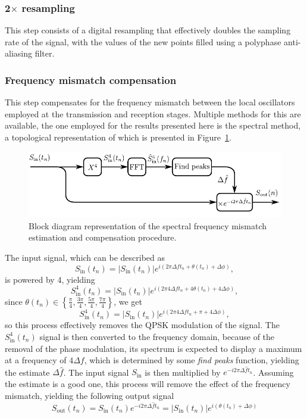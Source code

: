 \subsubsection{2$\times$ resampling}

This step consists of a digital resampling that effectively doubles the sampling rate of the signal, with the values of the new points filled using a polyphase anti-aliasing filter.

\subsubsection{Frequency mismatch compensation}

This step compensates for the frequency mismatch between the local oscillators employed at the transmission and reception stages. Multiple methods for this are available, the one employed for the results presented here is the spectral method, a topological representation of which is presented in Figure~\ref{fig:mqamDiagramDSP_FE_spectral}.
%
\begin{figure}[h]
\centering
\includegraphics[width=.7\linewidth]{./sdf/m_qam_system/figures/DSP_section/diagramDSP_FE_spectral}
\caption{Block diagram representation of the spectral frequency mismatch estimation and compensation procedure.}
\label{fig:mqamDiagramDSP_FE_spectral}
\end{figure}
%
The input signal, which can be described as
\begin{equation}
S_\text{in}(t_n)=|S_\text{in}(t_n)|e^{i\left(2\pi\Delta f t_n+\theta(t_n)+\Delta\phi\right)},
\end{equation}
is powered by 4, yielding
\begin{equation}
S^4_\text{in}(t_n)=|S_\text{in}(t_n)|e^{i\left(2\pi4\Delta f t_n+4\theta(t_n)+4\Delta\phi\right)},
\end{equation}
since $\theta(t_n)\in\left\lbrace \frac{\pi}{4},\frac{3\pi}{4},\frac{5\pi}{4},\frac{7\pi}{4}\right\rbrace$, we get
\begin{equation}
S^4_\text{in}(t_n)=|S_\text{in}(t_n)|e^{i\left(2\pi4\Delta f t_n+\pi+4\Delta\phi\right)},
\end{equation}
so this process effectively removes the QPSK modulation of the signal. The $S^4_\text{in}(t_n)$ signal is then converted to the frequency domain, because of the removal of the phase modulation, its spectrum is expected to display a maximum at a frequency of $4\Delta f$, which is determined by some \textit{find peaks} function, yielding the estimate $\Delta\hat{f}$. The input signal $S_\text{in}$ is then multiplied by $e^{-i2\pi\Delta\hat{f}t_n}$. Assuming the estimate is a good one, this process will remove the effect of the frequency mismatch, yielding the following output signal
\begin{equation}
S_\text{out}(t_n)=S_\text{in}(t_n)e^{-i2\pi\Delta\hat{f}t_n}=|S_\text{in}(t_n)|e^{i\left(\theta(t_n)+\Delta\phi\right)}
\end{equation}

